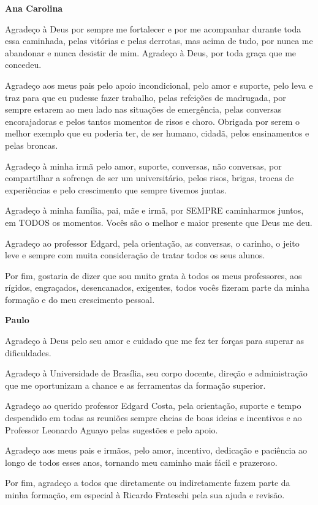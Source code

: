 \begin{agradecimentos}

\textbf{Ana Carolina}

Agradeço à Deus por sempre me fortalecer e por me acompanhar durante toda essa caminhada, pelas vitórias e pelas derrotas, mas acima de tudo, por nunca me abandonar e nunca desistir de mim. Agradeço à Deus, por toda graça que me concedeu.

Agradeço aos meus pais pelo apoio incondicional, pelo amor e suporte, pelo leva e traz para que eu pudesse fazer trabalho, pelas refeições de madrugada, por sempre estarem ao meu lado nas situações de emergência, pelas conversas encorajadoras e pelos tantos momentos de risos e choro. Obrigada por serem o melhor exemplo que eu poderia ter, de ser humano, cidadã, pelos ensinamentos e pelas broncas.

Agradeço à minha irmã pelo amor, suporte, conversas, não conversas, por compartilhar a sofrença de ser um universitário, pelos risos, brigas, trocas de experiências e pelo crescimento que sempre tivemos juntas.

Agradeço à minha família, pai, mãe e irmã, por SEMPRE caminharmos juntos, em TODOS os momentos. Vocês são o melhor e maior presente que Deus me deu.

Agradeço ao professor Edgard, pela orientação, as conversas, o carinho, o jeito leve e sempre com muita consideração de tratar todos os seus alunos. 

Por fim, gostaria de dizer que sou muito grata à todos os meus professores, aos rígidos, engraçados, desencanados, exigentes, todos vocês fizeram parte da minha formação e do meu crescimento pessoal.

\textbf{Paulo}

Agradeço à Deus pelo seu amor e cuidado que me fez ter forças para superar as dificuldades.

Agradeço à Universidade de Brasília, seu corpo docente, direção e administração que me oportunizam a chance e as ferramentas da formação superior.

Agradeço ao querido professor Edgard Costa, pela orientação, suporte e tempo despendido em todas as reuniões sempre cheias de boas ideias e incentivos e ao Professor Leonardo Aguayo pelas sugestões e pelo apoio.

Agradeço aos meus pais e irmãos, pelo amor, incentivo, dedicação e paciência ao longo de todos esses anos, tornando meu caminho mais fácil e prazeroso.

Por fim, agradeço a todos que diretamente ou indiretamente fazem parte da minha formação, em especial à Ricardo Frateschi pela sua ajuda e revisão.	

\end{agradecimentos}